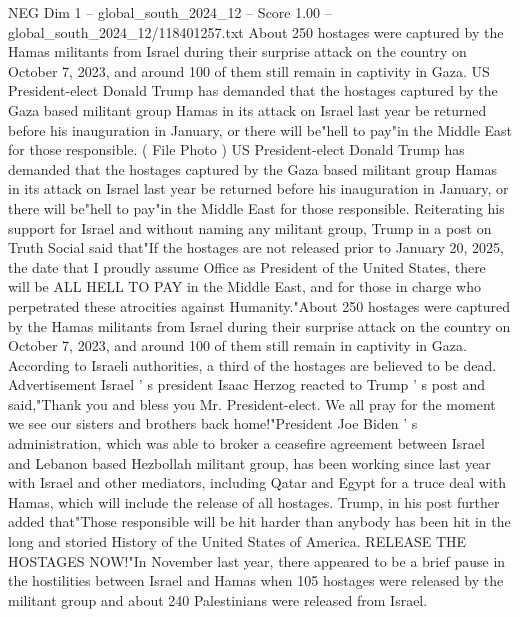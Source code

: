 \begin{textsample}{NEG Dim 1 – global\_south\_2024\_12 – Score 1.00 – global\_south\_2024\_12/118401257.txt}  \label{ex:f1_neg_343}
About 250 hostages were captured by the Hamas militants from Israel during their surprise attack on the country on October 7, 2023, and around 100 of them still remain in captivity in Gaza.
US President-elect Donald Trump has demanded that the hostages captured by the Gaza based militant group Hamas in its attack on Israel last year be returned before his inauguration in January, or there will be"hell to pay"in the Middle East for those responsible. ( File Photo ) US President-elect Donald Trump has demanded that the hostages captured by the Gaza based militant group Hamas in its attack on Israel last year be returned before his inauguration in January, or there will be"hell to pay"in the Middle East for those responsible.
Reiterating his support for Israel and without naming any militant group, Trump in a post on Truth Social said that"If the hostages are not released prior to January 20, 2025, the date that I proudly assume Office as President of the United States, there will be ALL HELL TO PAY in the Middle East, and for those in charge who perpetrated these atrocities against Humanity."About 250 hostages were captured by the Hamas militants from Israel during their surprise attack on the country on October 7, 2023, and around 100 of them still remain in captivity in Gaza.
According to Israeli authorities, a third of the hostages are believed to be dead.
Advertisement Israel ' s president Isaac Herzog reacted to Trump ' s post and said,"Thank you and bless you Mr.
President-elect.
We all pray for the moment we see our sisters and brothers back home!"President Joe Biden ' s administration, which was able to broker a ceasefire agreement between Israel and Lebanon based Hezbollah militant group, has been working since last year with Israel and other mediators, including Qatar and Egypt for a truce deal with Hamas, which will include the release of all hostages.
Trump, in his post further added that"Those responsible will be hit harder than anybody has been hit in the long and storied History of the United States of America.
RELEASE THE HOSTAGES NOW!"In November last year, there appeared to be a brief pause in the hostilities between Israel and Hamas when 105 hostages were released by the militant group and about 240 Palestinians were released from Israel.

\end{textsample}
